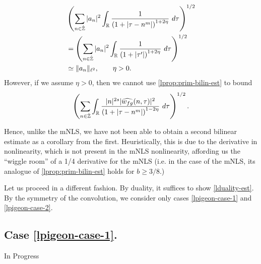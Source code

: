 \begin{equation*}
	\begin{split}
		& \left( \sum_{n \in \zzdot} | a_{n} |^2\int_{\rr} \frac{1}{\left( 1 + | \tau -
		n^{m } | \right)^{1 + 2 \eta}} \ d \tau  
		\right)^{1/2} 
		\\
		& = \left ( \sum_{n \in \zzdot}
		| a_n |^2 
		\int_{\rr} \frac{1}{\left( 1 + | \tau' | \right)^{1 + 2 \eta}} \ d 
		\tau \right)^{1/2}
		\\
		& \simeq \|a_n\|_{\ell^2}, \qquad \eta >0.
		\end{split}
\end{equation*}
However, if we assume $\eta >0$, then
we cannot use \cref{lprop:prim-bilin-est} to bound
\begin{equation*}
	\begin{split}
		\left ( \sum_{n \in \dot{\mathbb{Z}}}\int_{\mathbb{R}} \frac{|n|^{2s} | \widehat{w_{fg}}(n, \tau) 
		|^2}{\left( 1 + | \tau - n^{m } | \right)^{1 - 2\eta}}\ d \tau
		\right)^{1/2}. 
	\end{split}
\end{equation*}
\begin{remark}
Hence, unlike the mNLS, we have not been able to obtain a second bilinear
estimate as a corollary from the first. Heuristically, this is due to the
derivative in nonlinearity, which is not present in the mNLS nonlinearity,
affording us the ``wiggle room''  of a 1/4 derivative for the mNLS (i.e. in the case
of the mNLS, its analogue of \cref{lprop:prim-bilin-est} holds for $b \ge
3/8$.)
\end{remark}
%
%
Let us proceed in a different fashion. By duality, it suffices to show
\eqref{lduality-est}. By the symmetry of the convolution, we consider only cases
\eqref{lpigeon-case-1} and \eqref{lpigeon-case-2}.
%
%
\subsection{Case \eqref{lpigeon-case-1}.} In Progress
%
%
%
%
